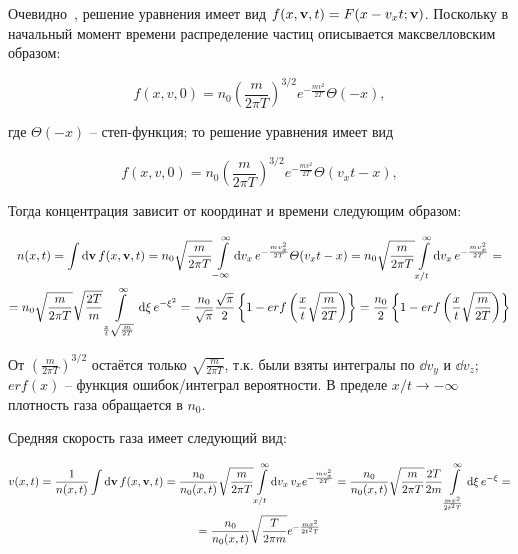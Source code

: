 \documentclass[10pt, a4paper]{article}
\begin{document}
Очевидно~\cite{silin}, решение уравнения имеет вид $f(x, \vb{v}, t) = F(x-v_xt; \vb{v})$. Поскольку в начальный момент времени распределение частиц описывается максвелловским образом:

\begin{equation*}
	f(x, v, 0) = n_0\left(\frac{m}{2\pi T}\right)^{3/2}e^{-\frac{mv^2}{2T}}\varTheta(-x),
\end{equation*}

где $\varTheta(-x)$ -- степ-функция; то решение уравнения имеет вид

\begin{equation*}
	f(x, v, 0) = n_0\left(\frac{m}{2\pi T}\right)^{3/2}e^{-\frac{mv^2}{2T}}\varTheta(v_xt-x),
\end{equation*}

Тогда концентрация зависит от координат и времени следующим образом:

\begin{multline*}
	n(x, t) = \int\dd{\vb{v}}f(x, \vb{v}, t) = n_0\sqrt{\frac{m}{2\pi T}} \int\limits_{-\infty}^\infty \dd{v_x}e^{-\frac{mv_x^2}{2T}}\varTheta(v_xt-x) = n_0\sqrt{\frac{m}{2\pi T}} \int\limits_{x/t}^\infty \dd{v_x}e^{-\frac{mv_x^2}{2T}} = \\
	= n_0\sqrt{\frac{m}{2\pi T}} \sqrt{\frac{2T}{m}} \int\limits_{\frac{x}{t}\sqrt{\frac{m}{2T}}}^\infty\dd{\xi}e^{-\xi^2} = \frac{n_0}{\sqrt{\pi}}\frac{\sqrt{\pi}}{2}\left\lbrace 1-erf\left(\frac{x}{t}\sqrt{\frac{m}{2T}}\right) \right\rbrace = \frac{n_0}{2}\left\lbrace 1 - erf \left(\frac{x}{t} \sqrt{\frac{m}{2T}}\right) \right\rbrace
\end{multline*}

От $\left(\frac{m}{2\pi T}\right)^{3/2}$ остаётся только $\sqrt{\frac{m}{2\pi T}}$, т.к. были взяты интегралы по $\dd{v_y}$ и $\dd{v_z}$; $erf(x)$ -- функция ошибок/интеграл вероятности. В пределе $x/t\rightarrow-\infty$ плотность газа обращается в $n_0$.

Средняя скорость газа имеет следующий вид:

\begin{multline*}
	v(x, t) = \frac{1}{n(x, t)}\int\dd{\vb{v}}f(x, \vb{v}, t) = \frac{n_0}{n_0(x, t)}\sqrt{\frac{m}{2\pi T}}\int\limits_{x/t}^\infty\dd{v_x}v_xe^{-\frac{mv_x^2}{2T}} = \frac{n_0}{n_0(x, t)}\sqrt{\frac{m}{2\pi T}}\frac{2T}{2m} \int\limits_{\frac{mx^2}{2t^2T}}^\infty\dd{\xi}e^{-\xi} = \\
	= \frac{n_0}{n_0(x, t)}\sqrt{\frac{T}{2\pi m}}e^{-\frac{mx^2}{2t^2T}}
\end{multline*}
\end{document}

